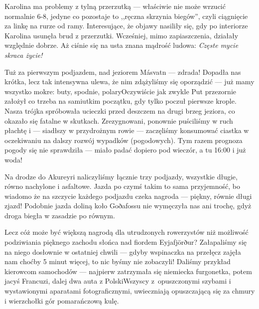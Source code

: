 
Karolina ma problemy z tylną przerzutką --- właściwie nie może wrzucić normalnie 6-8, jedyne co pozostaje to ,,ręczna skrzynia biegów'', czyli ciągnięcie za linkę na rurze od ramy. Interesujące, że objawy nasiliły się, gdy po interiorze Karolina usunęła brud z przerzutki. Wcześniej, mimo zapiaszczenia, działały względnie dobrze. Aż ciśnie się na usta znana mądrość ludowa: \emph{Częste mycie skraca życie!}

Tuż za pierwszym podjazdem, nad jeziorem Másvatn --- zdrada! Dopadła nas krótka, lecz tak intensywna ulewa, że nim zdążyliśmy się oporządzić --- już mamy wszystko mokre: buty, spodnie, polary\textellipsis Oczywiście jak zwykle Put przezornie założył co trzeba na samiutkim początku, gdy tylko poczuł pierwsze krople. Nasza trójka spróbowała ucieczki przed deszczem na drugi brzeg jeziora, co okazało się  fatalne w skutkach. Zrezygnowani, ponownie puściliśmy w ruch płachtę i --- siadłszy w przydrożnym rowie --- zaczęliśmy konsumować ciastka w oczekiwaniu na dalszy rozwój wypadków (pogodowych). Tym razem prognoza pogody się nie sprawdziła --- miało padać dopiero pod wieczór, a tu 16:00 i już woda!

Na drodze do Akureyri naliczyliśmy łącznie trzy podjazdy, wszystkie długie, równo nachylone i asfaltowe. Jazda po czymś takim to sama przyjemność, bo wiadomo że na szczycie każdego podjazdu czeka nagroda --- piękny, równie długi zjazd! Podobnie jazda doliną koło Goðafossu nie wymęczyła nas ani trochę, gdyż droga biegła w zasadzie po równym.


Lecz cóż może być większą nagrodą dla utrudzonych rowerzystów niż możliwość podziwiania pięknego zachodu słońca nad fiordem Eyjafjörður? Załapaliśmy się na niego dosłownie w ostatniej chwili --- gdyby wspinaczka na przełęcz zajęła nam choćby 5 minut więcej, to nic byśmy nie zobaczyli! Daliśmy przykład kierowcom samochodów --- najpierw zatrzymała się niemiecka furgonetka, potem jacyś Francuzi, dalej dwa auta z Polski\textellipsis Wszyscy z~opuszczonymi szybami i wystawionymi aparatami fotograficznymi, uwieczniają opuszczającą się za chmury i wierzchołki gór pomarańczową kulę.

\pagebreak


